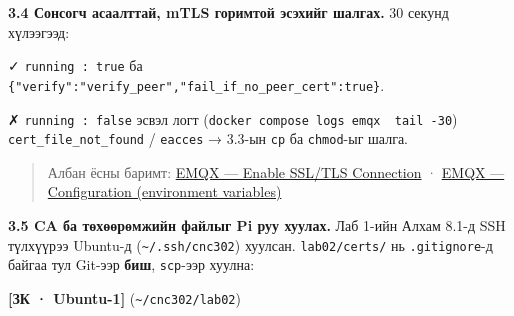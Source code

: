 \textbf{3.4 Сонсогч асаалттай, mTLS горимтой эсэхийг шалгах.} 30 секунд хүлээгээд:

\begin{Shaded}
\begin{Highlighting}[]
\KeywordTok{|} 
\StringTok{:}\KeywordTok{\textbackslash{}}
  \KeywordTok{|}  
\end{Highlighting}
\end{Shaded}

✓ \texttt{running\ :\ true} ба \texttt{\{"verify":\allowbreak{}"verify\_\allowbreak{}peer","fail\_\allowbreak{}if\_\allowbreak{}no\_\allowbreak{}peer\_\allowbreak{}cert":\allowbreak{}true\}}.

✗ \texttt{running\ :\allowbreak{}\ false} эсвэл логт (\texttt{docker\ compose\ logs\ emqx\ \textbar{}\ tail\ -30}) \texttt{cert\_\allowbreak{}file\_\allowbreak{}not\_\allowbreak{}found} / \texttt{eacces} → 3.3-ын \texttt{cp} ба \texttt{chmod}-ыг шалга.

\begin{quote}
Албан ёсны баримт: \href{https://docs.emqx.com/en/emqx/v5.8/guides/network/emqx-mqtt-tls.html}{EMQX --- Enable SSL/\allowbreak{}TLS Connection} · \href{https://docs.emqx.com/en/emqx/v5.8/guides/configuration/configuration.html}{EMQX --- Configuration (environment variables)}
\end{quote}

\textbf{3.5 CA ба төхөөрөмжийн файлыг Pi руу хуулах.} Лаб 1-ийн Алхам 8.1-д SSH түлхүүрээ Ubuntu-д (\texttt{\textasciitilde{}/.ssh/cnc302}) хуулсан. \texttt{lab02/certs/} нь \texttt{.gitignore}-д байгаа тул Git-ээр \textbf{биш}, \texttt{scp}-ээр хуулна:

\textbf{{[}ЗК · Ubuntu-1{]}} (\texttt{\textasciitilde{}/cnc302/lab02})

\begin{Shaded}
\begin{Highlighting}[]
\KeywordTok{\textbackslash{}}
    \OperatorTok{\textless{}}\OperatorTok{\textgreater{}}
\end{Highlighting}
\end{Shaded}

